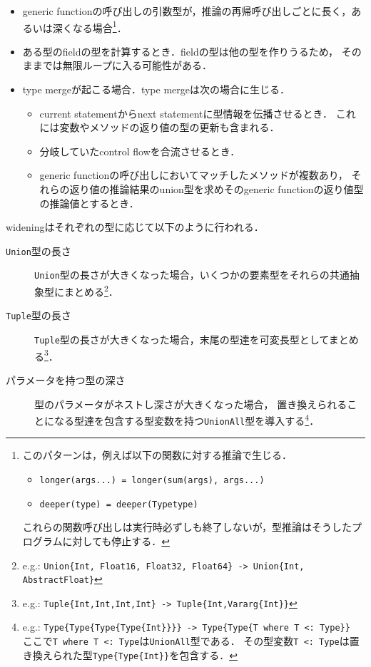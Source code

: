 \begin{itemize}
  \item generic functionの呼び出しの引数型が，推論の再帰呼び出しごとに長く，あるいは深くなる場合\footnote{
          このパターンは，例えば以下の関数に対する推論で生じる．
          \begin{itemize}
            \item \texttt{longer(args...) = longer(sum(args), args...)}
            \item \texttt{deeper(type) = deeper(Type{type})}
          \end{itemize}
          これらの関数呼び出しは実行時必ずしも終了しないが，型推論はそうしたプログラムに対しても停止する．
        }．
  \item ある型のfieldの型を計算するとき．fieldの型は他の型を作りうるため，
        そのままでは無限ループに入る可能性がある．
  \item type mergeが起こる場合．type mergeは次の場合に生じる．
        \begin{itemize}
          \item current statementからnext statementに型情報を伝播させるとき．
                これには変数やメソッドの返り値の型の更新も含まれる．
          \item 分岐していたcontrol flowを合流させるとき．
          \item generic functionの呼び出しにおいてマッチしたメソッドが複数あり，
                それらの返り値の推論結果のunion型を求めそのgeneric functionの返り値型の推論値とするとき．
        \end{itemize}
\end{itemize}

wideningはそれぞれの型に応じて以下のように行われる．

\begin{description}
  \item [\texttt{Union}型の長さ]
        \texttt{Union}型の長さが大きくなった場合，いくつかの要素型をそれらの共通抽象型にまとめる\footnote{
          e.g.: \texttt{Union\{Int, Float16, Float32, Float64\} -> Union\{Int, AbstractFloat\}}
        }．
  \item [\texttt{Tuple}型の長さ]
        \texttt{Tuple}型の長さが大きくなった場合，末尾の型達を可変長型としてまとめる\footnote{
          e.g.: \texttt{Tuple\{Int,Int,Int,Int\} -> Tuple\{Int,Vararg\{Int\}\}}
        }．
  \item [パラメータを持つ型の深さ]
        型のパラメータがネストし深さが大きくなった場合，
        置き換えられることになる型達を包含する型変数を持つ\texttt{UnionAll}型を導入する\footnote{
          e.g.: \texttt{Type\{Type\{Type\{Type\{Int\}\}\}\} -> Type\{Type\{T where T <: Type\}\}}\\
          ここで\texttt{T where T <: Type}は\texttt{UnionAll}型である．
          その型変数\texttt{T <: Type}は置き換えられた型\texttt{Type\{Type\{Int\}\}}を包含する．
        }．
\end{description}

